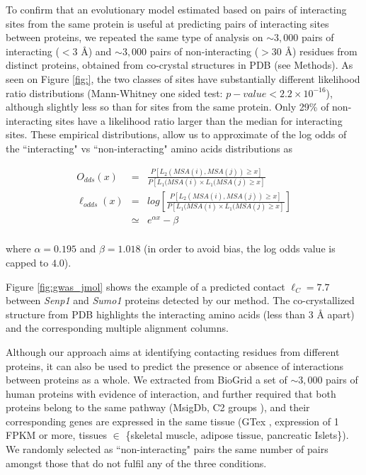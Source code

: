 To confirm that an evolutionary model estimated based on pairs of interacting sites from the same protein is useful at predicting pairs of interacting sites between proteins, we repeated the same type of analysis on $\sim 3,000$ pairs of interacting ($< 3$ \r{A}) and $\sim 3,000$ pairs of non-interacting ($>30$ \r{A}) residues from distinct proteins, obtained from co-crystal structures in PDB (see Methods). As seen on Figure \ref{fig:}, the two classes of sites have substantially different likelihood ratio distributions (Mann-Whitney one sided test: $p-value < 2.2 \times 10^{-16}$), although slightly less so than for sites from the same protein. Only 29\% of non-interacting sites have a likelihood ratio larger than the median for interacting sites. These empirical distributions, allow us to approximate of the log odds of the ``interacting" vs ``non-interacting" amino acids distributions as

\begin{eqnarray*}
O_{dds}(x) & = & \frac{P[ L_2(MSA(i), MSA(j)) \ge x ]}{P[ L_1(MSA(i) \times L_1(MSA(j) \ge x]} \\
\ell_{odds}(x) & = & log\left[ \frac{P[ L_2(MSA(i), MSA(j)) \ge x ]}{P[ L_1(MSA(i) \times L_1(MSA(j) \ge x]} \right] \\
    & \simeq &e^{\alpha x}- \beta \\
\end{eqnarray*}

\noindent where $\alpha = 0.195$ and $\beta = 1.018$ (in order to avoid bias, the log odds value is capped to $4.0$).


Figure \ref{fig:gwas_jmol} shows the example of a predicted contact $\ell_C = 7.7$ between \textit{Senp1} and \textit{Sumo1} proteins detected by our method. The co-crystallized structure from PDB highlights the interacting amino acids (less than $3$ \r{A} apart) and the corresponding multiple alignment columns.

Although our approach aims at identifying contacting residues from different proteins, it can also be used to predict the presence or absence of interactions between proteins as a whole. We extracted from BioGrid \cite{stark2006biogrid} a set of $\sim3,000$ pairs of human proteins with evidence of interaction, and further required that both proteins belong to the same pathway (MsigDb, C2 groups \cite{subramanian2005gene}), and their corresponding genes are expressed in the same tissue (GTex \cite{lonsdale2013genotype}, expression of 1 FPKM or more, tissues $\in$ \{skeletal muscle, adipose tissue, pancreatic Islets\}). We randomly selected as ``non-interacting" pairs the same number of pairs amongst those that do not fulfil any of the three conditions.

